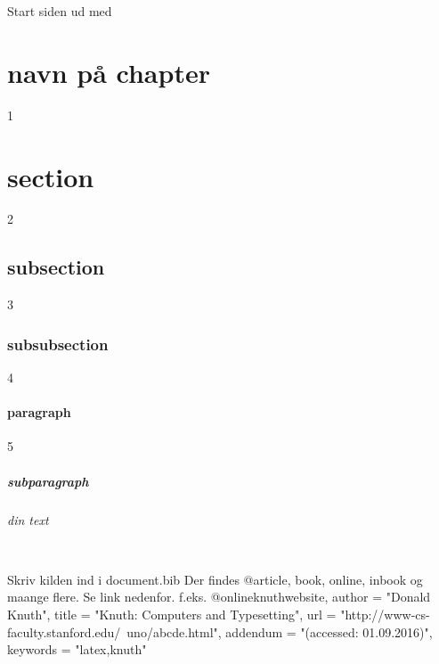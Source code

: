 


Start siden ud med \section{navn på chapter}


1	\section{section}               %
2	\subsection{subsection}         %
3	\subsubsection{subsubsection}   %
4	\paragraph{paragraph}
5	\subparagraph{subparagraph}


\emph{din text} %

\\          %
\smallskip  %
\medskip
\bigskip
\linebreak[0-4] %

\vfil       %

\clearpage  %
\newpage    %


Skriv kilden ind i document.bib 
Der findes @article, book, online, inbook og maange flere. Se link nedenfor.
f.eks. 
@online{knuthwebsite,
    author = "Donald Knuth",
    title = "Knuth: Computers and Typesetting",
    url  = "http://www-cs-faculty.stanford.edu/~uno/abcde.html",
    addendum = "(accessed: 01.09.2016)",
    keywords = "latex,knuth"
}

